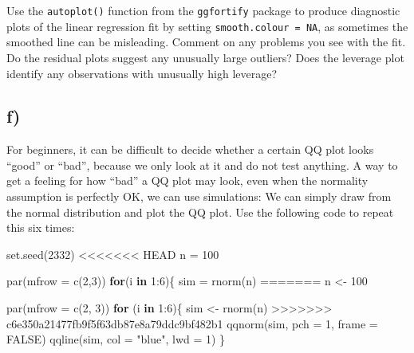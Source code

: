 \documentclass[
]{article}
\newenvironment{Shaded}{\begin{snugshade}}{\end{snugshade}}
\newcommand{\AttributeTok}[1]{\textcolor[rgb]{0.77,0.63,0.00}{#1}}
\newcommand{\ConstantTok}[1]{\textcolor[rgb]{0.00,0.00,0.00}{#1}}
\newcommand{\ControlFlowTok}[1]{\textcolor[rgb]{0.13,0.29,0.53}{\textbf{#1}}}
\newcommand{\DecValTok}[1]{\textcolor[rgb]{0.00,0.00,0.81}{#1}}
\newcommand{\FunctionTok}[1]{\textcolor[rgb]{0.00,0.00,0.00}{#1}}
\newcommand{\NormalTok}[1]{#1}
\newcommand{\OtherTok}[1]{\textcolor[rgb]{0.56,0.35,0.01}{#1}}
\newcommand{\SpecialCharTok}[1]{\textcolor[rgb]{0.00,0.00,0.00}{#1}}
\newcommand{\StringTok}[1]{\textcolor[rgb]{0.31,0.60,0.02}{#1}}
\begin{document}
Use the \texttt{autoplot()} function from the \texttt{ggfortify} package
to produce diagnostic plots of the linear regression fit by setting
\texttt{smooth.colour\ =\ NA}, as sometimes the smoothed line can be
misleading. Comment on any problems you see with the fit. Do the
residual plots suggest any unusually large outliers? Does the leverage
plot identify any observations with unusually high leverage?

\hypertarget{f}{%
\subsection{f)}\label{f}}

For beginners, it can be difficult to decide whether a certain QQ plot
looks ``good'' or ``bad'', because we only look at it and do not test
anything. A way to get a feeling for how ``bad'' a QQ plot may look,
even when the normality assumption is perfectly OK, we can use
simulations: We can simply draw from the normal distribution and plot
the QQ plot. Use the following code to repeat this six times:

\begin{Shaded}
\begin{Highlighting}[]
\FunctionTok{set.seed}\NormalTok{(}\DecValTok{2332}\NormalTok{)}
<<<<<<< HEAD
\NormalTok{n }\OtherTok{=} \DecValTok{100}

\FunctionTok{par}\NormalTok{(}\AttributeTok{mfrow =} \FunctionTok{c}\NormalTok{(}\DecValTok{2}\NormalTok{,}\DecValTok{3}\NormalTok{))}
\ControlFlowTok{for}\NormalTok{(i }\ControlFlowTok{in} \DecValTok{1}\SpecialCharTok{:}\DecValTok{6}\NormalTok{)\{}
\NormalTok{  sim }\OtherTok{=} \FunctionTok{rnorm}\NormalTok{(n)}
=======
\NormalTok{n }\OtherTok{\textless{}{-}} \DecValTok{100}

\FunctionTok{par}\NormalTok{(}\AttributeTok{mfrow =} \FunctionTok{c}\NormalTok{(}\DecValTok{2}\NormalTok{, }\DecValTok{3}\NormalTok{))}
\ControlFlowTok{for}\NormalTok{ (i }\ControlFlowTok{in} \DecValTok{1}\SpecialCharTok{:}\DecValTok{6}\NormalTok{)\{}
\NormalTok{  sim }\OtherTok{\textless{}{-}} \FunctionTok{rnorm}\NormalTok{(n)}
>>>>>>> c6e350a21477fb9f5f63db87e8a79ddc9bf482b1
  \FunctionTok{qqnorm}\NormalTok{(sim, }\AttributeTok{pch =} \DecValTok{1}\NormalTok{, }\AttributeTok{frame =} \ConstantTok{FALSE}\NormalTok{)}
  \FunctionTok{qqline}\NormalTok{(sim, }\AttributeTok{col =} \StringTok{"blue"}\NormalTok{, }\AttributeTok{lwd =} \DecValTok{1}\NormalTok{)}
\NormalTok{\}}
\end{Highlighting}
\end{Shaded}
\end{document}
